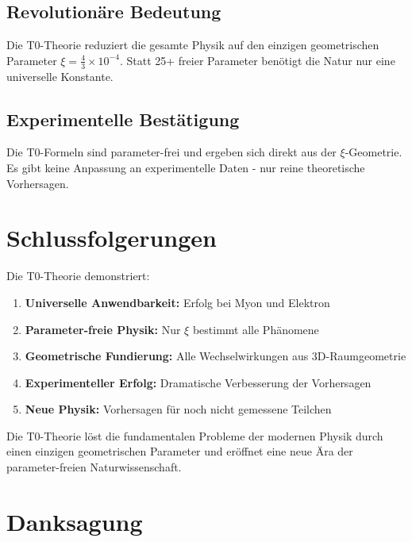 \documentclass[12pt,a4paper]{article}
\newcommand{\xipar}{\xi}
\begin{document}
	\subsection{Revolutionäre Bedeutung}
	
	\begin{revolution}
		Die T0-Theorie reduziert die gesamte Physik auf den einzigen geometrischen Parameter $\xipar = \frac{4}{3} \times 10^{-4}$. Statt 25+ freier Parameter benötigt die Natur nur eine universelle Konstante.
	\end{revolution}
	
	\subsection{Experimentelle Bestätigung}
	
	\begin{wichtig}
		Die T0-Formeln sind parameter-frei und ergeben sich direkt aus der $\xipar$-Geometrie. Es gibt keine Anpassung an experimentelle Daten - nur reine theoretische Vorhersagen.
	\end{wichtig}
	
	\section{Schlussfolgerungen}
	
	Die T0-Theorie demonstriert:
	
	\begin{enumerate}
		\item \textbf{Universelle Anwendbarkeit:} Erfolg bei Myon und Elektron
		\item \textbf{Parameter-freie Physik:} Nur $\xipar$ bestimmt alle Phänomene
		\item \textbf{Geometrische Fundierung:} Alle Wechselwirkungen aus 3D-Raumgeometrie
		\item \textbf{Experimenteller Erfolg:} Dramatische Verbesserung der Vorhersagen
		\item \textbf{Neue Physik:} Vorhersagen für noch nicht gemessene Teilchen
	\end{enumerate}
	
	\begin{erfolg}
		Die T0-Theorie löst die fundamentalen Probleme der modernen Physik durch einen einzigen geometrischen Parameter und eröffnet eine neue Ära der parameter-freien Naturwissenschaft.
	\end{erfolg}
	
	\section*{Danksagung}
	
\end{document}

